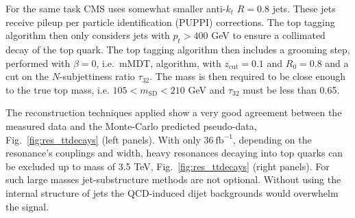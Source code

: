 For the same task CMS uses somewhat smaller anti-$k_t$ $R=0.8$ jets. These jets receive pileup per particle identification (PUPPI) \cite{Bertolini:2014bba} corrections. The top tagging algorithm then only considers jets with $p_t > 400$ GeV to ensure a collimated decay of the top quark. 
The top tagging algorithm then includes a grooming step, performed with \SD $\beta=0$, i.e.\ mMDT, algorithm, with $z_\mathrm{cut} = 0.1$ and $R_0 = 0.8$ and a cut on the $N$-subjettiness ratio $\tau_{32}$. The \SD mass is then required to be close enough to the true top mass, i.e. $105 < m_{\mathrm{SD}} < 210$ GeV and $\tau_{32}$ must be less than 0.65. 

The reconstruction techniques applied show a very good agreement between the measured data and the Monte-Carlo predicted pseudo-data, Fig.~\ref{fig:res_ttdecays} (left panels). With only $36~\mathrm{fb}^{-1}$, depending on the resonance's couplings and width, heavy resonances decaying into top quarks can be excluded up to mass of 3.5 TeV, Fig.~\ref{fig:res_ttdecays} (right panels). For such large masses jet-substructure methods are not optional. Without using the internal structure of jets the QCD-induced dijet backgrounds would overwhelm the signal.

